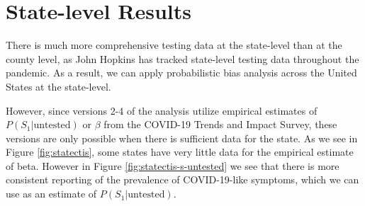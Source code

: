 \documentclass[12pt,twoside]{smiththesis}
\begin{document}
\hypertarget{state-level-results}{%
\section{State-level Results}\label{state-level-results}}

There is much more comprehensive testing data at the state-level than at the county level, as John Hopkins has tracked state-level testing data throughout the pandemic.
As a result, we can apply probabilistic bias analysis across the United States at the state-level.

However, since versions 2-4 of the analysis utilize empirical estimates of \(P(S_1|\text{untested})\) or \(\beta\) from the COVID-19 Trends and Impact Survey, these versions are only possible when there is sufficient data for the state. As we see in Figure \ref{fig:statectis}, some states have very little data for the empirical estimate of beta. However in Figure \ref{fig:statectis-s-untested} we see that there is more consistent reporting of the prevalence of COVID-19-like symptoms, which we can use as an estimate of \(P(S_1|\text{untested})\).
\end{document}
